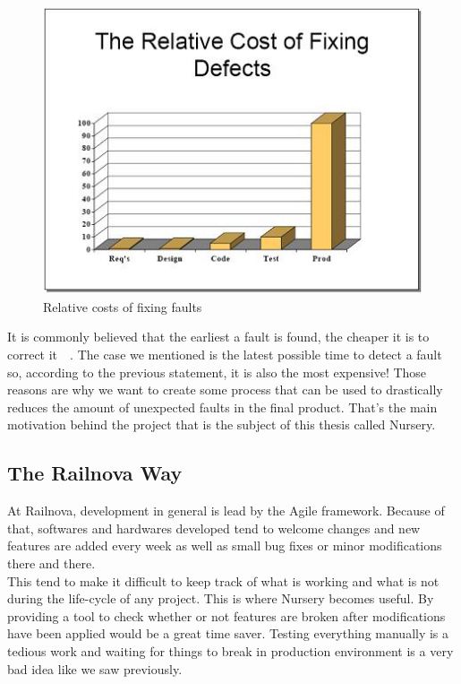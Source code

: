 \documentclass[12pt]{article}
\theoremstyle{definition}
\theoremstyle{definition}
\theoremstyle{remark}
\begin{document}
\begin{figure}
    \centering
    \includegraphics[scale=0.8]{STBC-costfixs.jpg}
    \caption{Relative costs of fixing faults~\cite{EconomicsSTBC:2017}}
    \label{STBC-costfixs}
\end{figure}

It is commonly believed that the earliest a fault is found, the cheaper it is to correct it~\cite{EconomicsSTBC:2017}~\cite{EconomicsWiki:2017}. The case we mentioned is the latest possible time to detect a fault so, according to the previous statement, it is also the most expensive! Those reasons are why we want to create some process that can be used to drastically reduces the amount of unexpected faults in the final product. That's the main motivation behind the project that is the subject of this thesis called Nursery.\\


\subsection{The Railnova Way}

At Railnova, development in general is lead by the Agile framework. Because of that, softwares and hardwares developed tend to welcome changes and new features are added every week as well as small bug fixes or minor modifications there and there.\\

This tend to make it difficult to keep track of what is working and what is not during the life-cycle of any project. This is where Nursery becomes useful. By providing a tool to check whether or not features are broken after modifications have been applied would be a great time saver. Testing everything manually is a tedious work and waiting for things to break in production environment is a very bad idea like we saw previously.\\
\end{document}
